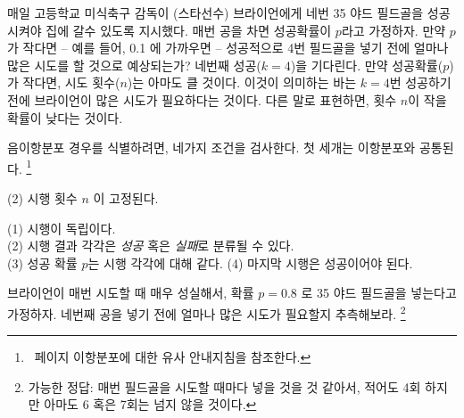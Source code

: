 \begin{example}{
매일 고등학교 미식축구 감독이 (스타선수) 브라이언에게 네번 35 야드 필드골을 성공시켜야 집에 갈수 있도록 지시했다. 매번 공을 차면 성공확률이 $p$라고 가정하자. 만약 $p$가 작다면 -- 예를 들어, 0.1 에 가까우면 -- 성공적으로 4번 필드골을 넣기 전에 얼마나 많은 시도를 할 것으로 예상되는가?}
네번째 성공($k=4$)을 기다린다. 만약 성공확률($p$)가 작다면, 시도 횟수($n$)는 아마도 클 것이다. 이것이 의미하는 바는 $k=4$번 성공하기 전에 브라이언이 많은 시도가 필요하다는 것이다. 다른 말로 표현하면, 횟수 $n$이 작을 확률이 낮다는 것이다.
\end{example}

음이항분포 경우를 식별하려면, 네가지 조건을 검사한다. 첫 세개는 이항분포와 공통된다. \footnote{\pageref{isItBinomialTipBox}~페이지 이항분포에 대한 유사 안내지침을 참조한다.}

(2) 시행 횟수 $n$ 이 고정된다. \\

\begin{tipBox}{
(1) 시행이 독립이다. \\
(2) 시행 결과 각각은 \emph{성공} 혹은 \emph{실패}로 분류될 수 있다. \\
(3) 성공 확률 $p$는 시행 각각에 대해 같다.
(4) 마지막 시행은 성공이어야 된다.}
\end{tipBox}

\begin{exercise}
브라이언이 매번 시도할 때 매우 성실해서, 확률 $p=0.8$ 로 35 야드 필드골을 넣는다고 가정하자. 네번째 공을 넣기 전에 얼마나 많은 시도가 필요할지 추측해보라.
\footnote{가능한 정답: 매번 필드골을 시도할 때마다 넣을 것을 것 같아서, 적어도 4회 하지만 아마도 6 혹은 7회는 넘지 않을 것이다.}
\end{exercise}

